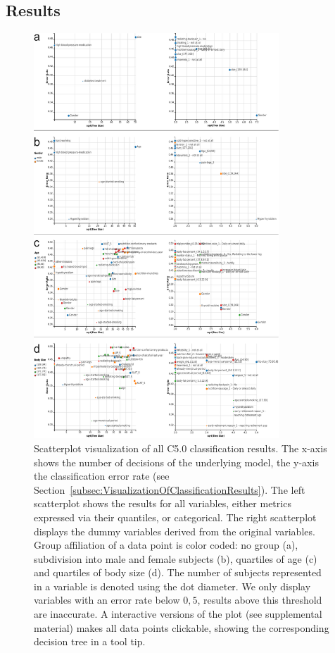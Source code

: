 \documentclass[a4paper,twoside]{style/article}
\begin{document}
\subsection{Results}
\begin{figure}[p!]
  \centering
  \includegraphics[width=0.82\textwidth]{figures/results}
  \caption{
Scatterplot visualization of all C5.0 classification results.
The x-axis shows the number of decisions of the underlying model, the y-axis the classification error rate (see Section~\ref{subsec:VisualizationOfClassificationResults}).
The left scatterplot shows the results for all variables, either metrics expressed via their quantiles, or categorical.
The right scatterplot displays the dummy variables derived from the original variables.
Group affiliation of a data point is color coded:
no group (a), subdivision into male and female subjects (b), quartiles of age (c) and quartiles of body size (d).
The number of subjects represented in a variable is denoted using the dot diameter.
We only display variables with an error rate below $0,5$, results above this threshold are inaccurate.
A interactive versions of the plot (see supplemental material) makes all data points clickable, showing the corresponding decision tree in a tool tip.
}
  \label{fig:results}
\end{figure}
\end{document}
